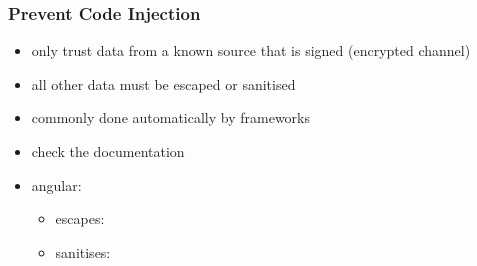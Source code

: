\begin{frame}[fragile] \frametitle{Prevent Code Injection}
\begin{itemize}
  \item only trust data from a known source that is signed (encrypted channel)
  \item all other data must be escaped or sanitised
  \item commonly done automatically by frameworks
  \item check the documentation
  \item angular:
  \begin{itemize}
    \item escapes: 
    \item sanitises: 
  \end{itemize}
\end{itemize}
\end{frame}
